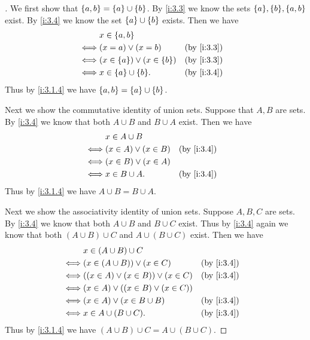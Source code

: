\begin{proof}[]
  We first show that \(\left\lbrace a, b\right\rbrace = \left\lbrace a\right\rbrace \cup \left\lbrace b\right\rbrace\).
  By \cref{i:3.3} we know the sets \(\set{a}, \set{b}, \set{a, b}\) exist.
  By \cref{i:3.4} we know the set \(\left\lbrace a\right\rbrace \cup \left\lbrace b\right\rbrace\) exists.
  Then we have
  \begin{align*}
         & x \in \set{a, b}                                     \\
    \iff & (x = a) \lor (x = b)                 &  & \by{i:3.3} \\
    \iff & (x \in \set{a}) \lor (x \in \set{b}) &  & \by{i:3.3} \\
    \iff & x \in \set{a} \cup \set{b}.          &  & \by{i:3.4}
  \end{align*}
  Thus by \cref{i:3.1.4} we have \(\left\lbrace a, b\right\rbrace = \left\lbrace a\right\rbrace \cup \left\lbrace b\right\rbrace\).

  Next we show the commutative identity of union sets.
  Suppose that \(A, B\) are sets.
  By \cref{i:3.4} we know that both \(A \cup B\) and \(B \cup A\) exist.
  Then we have
  \begin{align*}
         & x \in A \cup B                           \\
    \iff & (x \in A) \lor (x \in B) &  & \by{i:3.4} \\
    \iff & (x \in B) \lor (x \in A)                 \\
    \iff & x \in B \cup A.          &  & \by{i:3.4}
  \end{align*}
  Thus by \cref{i:3.1.4} we have \(A \cup B = B \cup A\).

  Next we show the associativity identity of union sets.
  Suppose \(A, B, C\) are sets.
  By \cref{i:3.4} we know that both \(A \cup B\) and \(B \cup C\) exist.
  Thus by \cref{i:3.4} again we know that both \((A \cup B) \cup C\) and \(A \cup (B \cup C)\) exist.
  Then we have
  \begin{align*}
         & x \in (A \cup B) \cup C                                   \\
    \iff & (x \in (A \cup B)) \lor (x \in C)         &  & \by{i:3.4} \\
    \iff & ((x \in A) \lor (x \in B)) \lor (x \in C) &  & \by{i:3.4} \\
    \iff & (x \in A) \lor ((x \in B) \lor (x \in C))                 \\
    \iff & (x \in A) \lor (x \in B \cup B)           &  & \by{i:3.4} \\
    \iff & x \in A \cup (B \cup C).                  &  & \by{i:3.4}
  \end{align*}
  Thus by \cref{i:3.1.4} we have \((A \cup B) \cup C = A \cup (B \cup C)\).


\end{proof}
